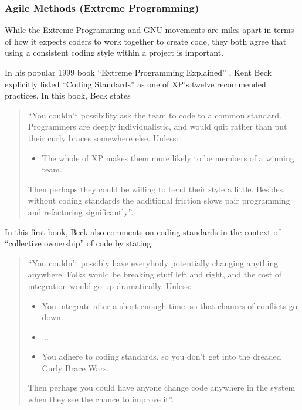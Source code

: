 %
\subsubsection{Agile Methods (Extreme Programming)}
%

While the Extreme Programming and GNU movements are miles apart in terms of
how it expects coders to work together to create code, they both agree that
using a consistent coding style within a project is important.

In his popular 1999 book ``Extreme Programming Explained''
{}\cite{ExtremeProgrammingExplained99}, Kent Beck explicitly listed ``Coding
Standards'' as one of XP's twelve recommended practices.  In this book, Beck
states

\begin{quote}

``You couldn't possibility ask the team to code to a common standard.
Programmers are deeply individualistic, and would quit rather than put their
curly braces somewhere else. Unless:

\begin{itemize}

{}\item The whole of XP makes them more likely to be members of a winning
team.

\end{itemize}

Then perhaps they could be willing to bend their style a little.  Besides,
without coding standards the additional friction slows pair programming and
refactoring significantly''.

\end{quote}

In this first book, Beck also comments on coding standards in the context of
``collective ownership'' of code by stating:

\begin{quote}

``You couldn't possibly have everybody potentially changing anything anywhere.
Folks would be breaking stuff left and right, and the cost of integration
would go up dramatically.  Unless:

\begin{itemize}

{}\item You integrate after a short enough time, so that chances of conflicts
go down.

{}\item ...

{}\item You adhere to coding standards, so you don't get into the dreaded
Curly Brace Wars.

\end{itemize}

Then perhaps you could have anyone change code anywhere in the system when
they see the chance to improve it''.

\end{quote}

